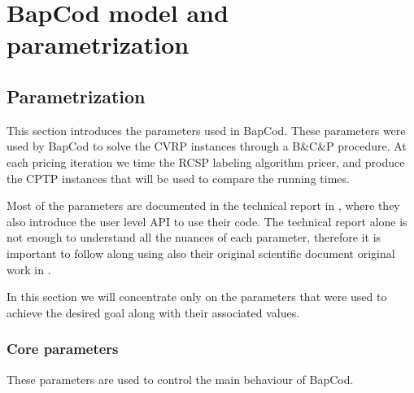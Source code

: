 \chapter{BapCod model and parametrization}


%
%
%

\section{Parametrization}

This section introduces the parameters used in BapCod.
These parameters were used by BapCod to solve the CVRP instances through a B\&C\&P procedure.
At each pricing iteration we time the RCSP labeling algorithm pricer, and produce the CPTP instances that will be used to compare the running times.


Most of the parameters are documented in the technical report in \cite{sadykov2021bapcod}, where they also introduce the user level API to use their code.
The technical report alone is not enough to understand all the nuances of each parameter, therefore it is important to follow along using also their original scientific document original work in \cite{pessoa2020generic}.

In this section we will concentrate only on the parameters that were used to achieve the desired goal along with their associated values.

\subsection{Core parameters}

These parameters are used to control the main behaviour of BapCod.


